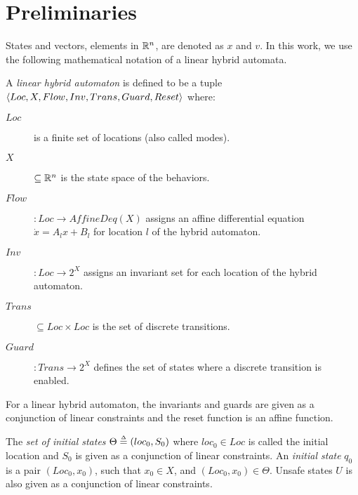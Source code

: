 \section{Preliminaries}
\label{sec:prelims}

States and vectors, elements in $\reals^n$, are denoted as $x$ and $v$. 
In this work, we use the following mathematical notation of a linear hybrid automata.

\begin{definition}
\label{def:hybridAutomata}
 A \emph{linear hybrid automaton} is defined to be a tuple
 $\tup{Loc, X, Flow, Inv, Trans, Guard, Reset}$ where:
\begin{description}
\item[$Loc$] is a finite set of locations (also called modes).
\item[$X$] $\subseteq \reals^n$ is the state space of the behaviors.
\item[$Flow$] $: Loc \rightarrow \textit{AffineDeq}(X)$ assigns an affine differential equation $\dot{x} = A_l x + B_l$ for location $l$ of the hybrid automaton.
\item[$Inv$] $: Loc \rightarrow 2^{X}$ assigns an invariant set for each location of the hybrid automaton.
\item[$Trans$] $\subseteq Loc \times Loc$ is the set of discrete transitions.
\item[$Guard$] $: Trans \rightarrow 2^{X}$ defines the set of states where a discrete transition is enabled.
\end{description}

For a linear hybrid automaton, the invariants and guards are given as a conjunction of linear constraints and the reset function is an affine function.
\end{definition}

The \textit{set of initial states} $\Theta \mathrel{\stackrel{\scriptscriptstyle\Delta}{=}} (loc_0, S_0)$ where $loc_0 \in Loc$ is called the initial location and $S_0$ is given as a conjunction of linear constraints.
%
An \textit{initial state} $q_0$ is a pair $(Loc_0, x_0)$, such that $x_0 \in X$, and $(Loc_0, x_0) \in \Theta$.
%
Unsafe states $U$ is also given as a conjunction of linear constraints. 

